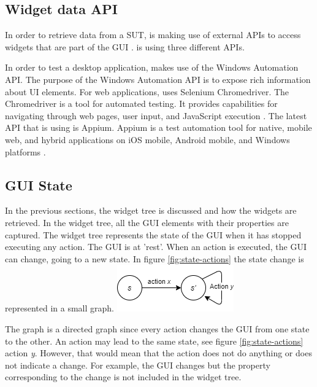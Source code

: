 \subsection{Widget data API}

In order to retrieve data from a SUT, \testar is making use of external APIs to access widgets that are part of the GUI \cite{thesisMulders}. \testar is using three different APIs.

In order to test a desktop application, \testar makes use of the Windows Automation API. The purpose of the Windows Automation API is to expose rich information about UI elements\cite{win-api-info}. For web applications, \testar uses Selenium Chromedriver. The Chromedriver is a tool for automated testing. It provides capabilities for navigating through web pages, user input, and JavaScript execution \cite{chrome-driver-info}. The latest API that \testar is using is Appium. Appium is a test automation tool for native, mobile web, and hybrid applications on iOS mobile, Android mobile, and Windows platforms \cite{appium-info}.

\subsection{GUI State} \label{gui-state}
In the previous sections, the widget tree is discussed and how the widgets are retrieved. In the widget tree, all the GUI elements with their properties are captured. The widget tree represents the state of the GUI when it has stopped executing any action. The GUI is at 'rest'. When an action is executed, the GUI can change, going to a new state. In figure \ref{fig:state-actions} the state change is represented in a small graph. 
\bigskip
\begingroup
\captionsetup{type=figure}
\includegraphics{images/state-action.png}
\label{fig:state-actions}
\endgroup

The graph is a directed graph since every action changes the GUI from one state to the other. An action may lead to the same state, see figure \ref{fig:state-actions} action \textit{y}. However, that would mean that the action does not do anything or \testar does not indicate a change. For example, the GUI changes but the property corresponding to the change is not included in the widget tree.

